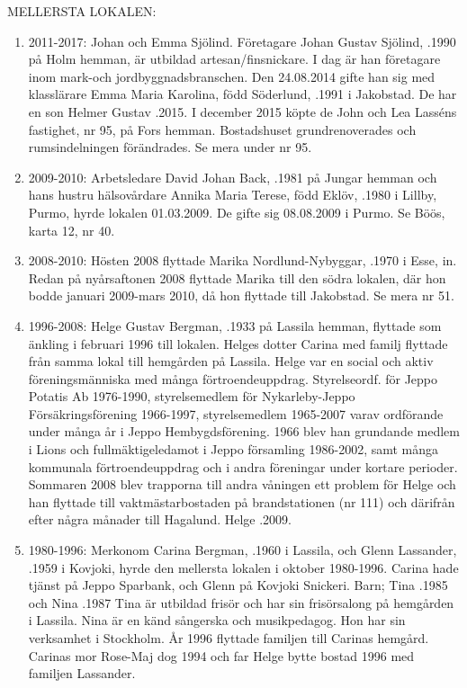 MELLERSTA LOKALEN:
\begin{enumerate}
  \item 2011-2017: Johan och Emma Sjölind. Företagare Johan Gustav Sjölind, .1990 på Holm hemman, är utbildad artesan/finsnickare. I dag är han företagare inom mark-och jordbyggnadsbranschen. Den 24.08.2014 gifte han sig med klasslärare Emma Maria Karolina, född Söderlund, .1991 i Jakobstad. De har	en son Helmer Gustav .2015. I december 2015 köpte de John och Lea Lasséns fastighet, nr 95, på Fors hemman. Bostadshuset grundrenoverades och rumsindelningen förändrades. Se mera under nr 95.
  \item 2009-2010: Arbetsledare David Johan Back, .1981 på Jungar hemman och hans hustru hälsovårdare Annika Maria Terese, född Eklöv, .1980 i Lillby, Purmo, hyrde lokalen 01.03.2009. De gifte sig 08.08.2009 i Purmo. Se Böös, karta 12, nr 40.
  \item 2008-2010: 	Hösten 2008 flyttade Marika Nordlund-Nybyggar, .1970 i Esse, in. Redan på nyårsaftonen 2008 flyttade Marika till den södra lokalen, där hon bodde januari 2009-mars 2010, då hon flyttade till Jakobstad. Se mera nr 51.
  \item 1996-2008: 	Helge Gustav Bergman, .1933 på Lassila hemman, flyttade som änkling i februari 1996 till lokalen. Helges dotter Carina med familj flyttade från samma lokal till hemgården på Lassila. Helge var en social och aktiv föreningsmänniska med många förtroendeuppdrag. Styrelseordf. för Jeppo Potatis Ab 1976-1990, styrelsemedlem för Nykarleby-Jeppo Försäkringsförening 1966-1997, styrelsemedlem 1965-2007 varav ordförande under många år i Jeppo Hembygdsförening. 1966 blev han grundande medlem i Lions och fullmäktigeledamot i Jeppo församling 1986-2002, samt många kommunala förtroendeuppdrag och i andra föreningar under kortare perioder. Sommaren 2008 blev trapporna till andra våningen ett problem för Helge och han flyttade till vaktmästarbostaden på brandstationen (nr 111) och därifrån efter några månader till Hagalund. Helge .2009.
  \item 1980-1996: Merkonom Carina Bergman, .1960 i Lassila, och Glenn Lassander, .1959 i Kovjoki, hyrde den mellersta lokalen i oktober 1980-1996. Carina hade tjänst på Jeppo Sparbank, och Glenn på Kovjoki Snickeri.
  Barn;	Tina .1985 och	Nina .1987
  Tina är utbildad frisör och har sin frisörsalong på hemgården i Lassila. Nina är en känd sångerska och musikpedagog. Hon har sin verksamhet i Stockholm. År 1996 flyttade familjen till Carinas hemgård. Carinas mor Rose-Maj dog 1994 och far Helge bytte bostad 1996 med familjen Lassander.

\end{enumerate}
